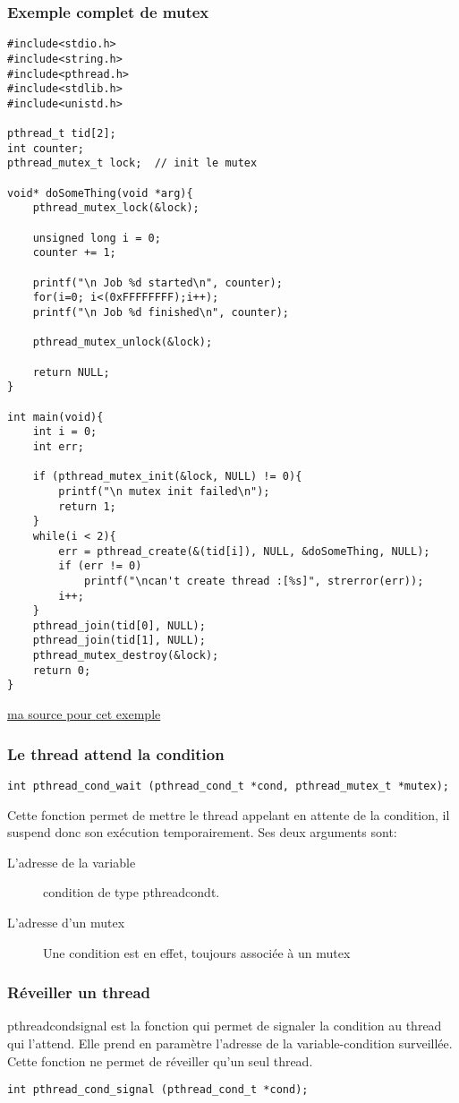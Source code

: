 \documentclass[a4paper]{article}
\begin{document}
\subsubsection{Exemple complet de mutex}
\begin{lstlisting}
#include<stdio.h>
#include<string.h>
#include<pthread.h>
#include<stdlib.h>
#include<unistd.h>

pthread_t tid[2];
int counter;
pthread_mutex_t lock;  // init le mutex

void* doSomeThing(void *arg){
    pthread_mutex_lock(&lock);

    unsigned long i = 0;
    counter += 1;

    printf("\n Job %d started\n", counter);
    for(i=0; i<(0xFFFFFFFF);i++);
    printf("\n Job %d finished\n", counter);

    pthread_mutex_unlock(&lock);

    return NULL;
}

int main(void){
    int i = 0;
    int err;

    if (pthread_mutex_init(&lock, NULL) != 0){
        printf("\n mutex init failed\n");
        return 1;
    }
    while(i < 2){
        err = pthread_create(&(tid[i]), NULL, &doSomeThing, NULL);
        if (err != 0)
            printf("\ncan't create thread :[%s]", strerror(err));
        i++;
    }
    pthread_join(tid[0], NULL);
    pthread_join(tid[1], NULL);
    pthread_mutex_destroy(&lock);
    return 0;
}
\end{lstlisting}
\href{https://www.thegeekstuff.com/2012/05/c-mutex-examples/}{ma source pour cet exemple}
\newpage
\subsubsection{Le thread attend la condition}
\begin{lstlisting}
int pthread_cond_wait (pthread_cond_t *cond, pthread_mutex_t *mutex);
\end{lstlisting}
Cette fonction permet de mettre le thread appelant en attente de la condition, il suspend donc son exécution temporairement.
Ses deux arguments sont:
\begin{description}
  \item [L'adresse de la variable] condition de type pthread\textunderscore{}cond\textunderscore{}t.
  \item [L'adresse d'un mutex] Une condition est en effet, toujours associée à un mutex
\end{description}
\subsubsection{Réveiller un thread}
pthread\textunderscore{}cond\textunderscore{}signal est la fonction qui permet de signaler la condition au thread qui l'attend.
Elle prend en paramètre l'adresse de la variable-condition surveillée. Cette fonction ne permet de réveiller qu'un seul thread.
\begin{lstlisting}
int pthread_cond_signal (pthread_cond_t *cond);
\end{lstlisting}
\end{document}
